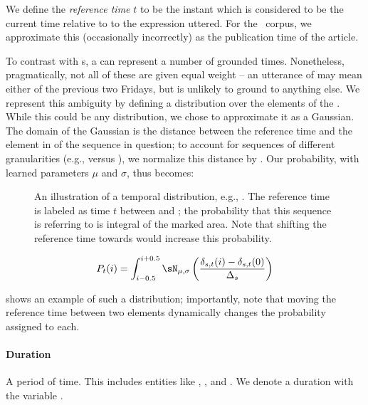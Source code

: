 We define the \textit{reference time} $t$ \cite{key:1947reichenback-temporal}
	to be the instant which is considered to be the current time relative to
	to the expression uttered.
For the \tempeval\ corpus, we approximate this (occasionally incorrectly) as the
	publication time of the article.

To contrast with s, a  can represent a number of grounded
	times.
Nonetheless, pragmatically, not all of these are given equal weight --
	an utterance of  may mean either of the previous two Fridays,
	but is unlikely to ground to anything else.
We represent this ambiguity by defining a distribution over the elements
	of the .
While this could be any distribution, we chose to approximate it as a
	Gaussian.
The domain of the Gaussian is the distance between the reference time
	and the element in of the sequence in question; to account for sequences
	of different granularities (e.g.,  versus ),
	we normalize this distance by \seqjump.
Our probability, with learned parameters $\mu$ and $\sigma$, thus becomes:
\begin{figure}[t]
\begin{center}
	\resizebox{1.1\hsize}{!}{
		
	}
	\caption{
		\label{fig:distribution}
		An illustration of a temporal distribution, e.g., .
		The reference time is labeled as time $t$ between  and 
			; the probability that this sequence is referring to
			 is integral of the marked area.
		Note that shifting the reference time towards  would increase
			this probability.
	}
\end{center}
\end{figure}
\begin{equation}
\label{eqn:gaussian}
	P_t(i) = 
	\int_{i-0.5}^{i+0.5}
		\sN_{\mu,\sigma}\left(\frac{\delta_{s,t}(i)-\delta_{s,t}(0)}{\seqjump}\right)
\end{equation}

 shows an example of such a distribution;
	importantly, note that moving the reference time between two elements
	dynamically changes the probability assigned to each.
	
\paragraph{Duration}
A period of time.
This includes entities like , , and .
We denote a duration with the variable \dur.

